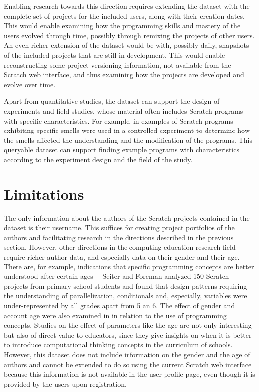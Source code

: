 \documentclass[10pt, conference]{IEEEtran}
\begin{document}
Enabling research towards this direction requires extending the dataset with the complete set of projects for the included users, along with their creation dates.
This would enable examining how the programming skills and mastery of the users evolved through time, possibly through remixing the projects of other users.
An even richer extension of the dataset would be with, possibly daily, snapshots of the included projects that are still in development.
This would enable reconstructing some project versioning information, not available from the Scratch web interface, and thus examining how the projects are developed and evolve over time.

Apart from quantitative studies, the dataset can support the design of experiments and field studies, whose material often includes Scratch programs with specific characteristics.
For example, in \cite{hermans_2016} examples of Scratch programs exhibiting specific smells were used in a controlled experiment to determine how the smells affected the understanding and the modification of the programs.
This queryable dataset can support finding example programs with characteristics according to the experiment design and the field of the study.

\section{Limitations}
The only information about the authors of the Scratch projects contained in the dataset is their username.
This suffices for creating project portfolios of the authors and facilitating research in the directions described in the previous section.
However, other directions in the computing education research field require richer author data, and especially data on their gender and their age.
There are, for example, indications that specific programming concepts are better understood after certain ages ---Seiter and Foreman \cite{Seiter_2013} analyzed 150 Scratch projects from primary school students and found that design patterns requiring the understanding of parallelization, conditionals and, especially, variables were under-represented by all grades apart from 5 an 6.
The effect of gender and account age were also examined in \cite{fields_2014} in relation to the use of programming concepts.
Studies on the effect of parameters like the age are not only interesting but also of direct value to educators, since they give insights on when it is better to introduce computational thinking concepts in the curriculum of schools.
However, this dataset does not include information on the gender and the age of authors and cannot be extended to do so using the current Scratch web interface because this information is not available in the user profile page\footnotemark[\ref{fn-authorpage}], even though it is provided by the users upon registration.
\end{document}
